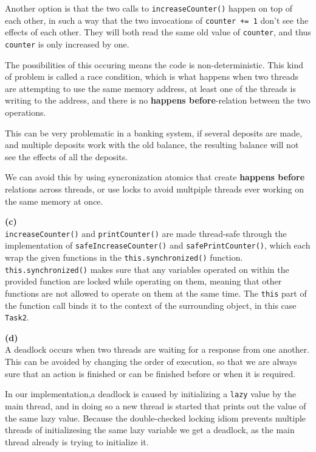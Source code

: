 \documentclass[12pt]{article}
\newcommand{\subtask}[1]{\hspace*{-1cm}\textbf{(#1)}\\[-5mm]}
\begin{document}
Another option is that the two calls to \verb|increaseCounter()| happen on top of each other,
in such a way that the two invocations of \verb|counter += 1| don't see the effects of each other.
They will both read the same old value of \verb|counter|, and thus \verb|counter| is only increased by one.

The possibilities of this occuring means the code is non-deterministic.
This kind of problem is called a race condition, which is what happens when
two threads are attempting to use the same memory address,
at least one of the threads is writing to the address,
and there is no \textbf{happens before}-relation between the two operations.

This can be very problematic in a banking system, if several deposits are made,
and multiple deposits work with the old balance, the resulting balance will not
see the effects of all the deposits.

We can avoid this by using syncronization atomics that create \textbf{happens before}
relations across threads, or use locks to avoid multpiple threads ever working on the same memory at once.

\subtask{c}
\verb|increaseCounter()| and \verb|printCounter()| are made thread-safe through the implementation of \verb|safeIncreaseCounter()| and \verb|safePrintCounter()|, which each wrap the given functions in the \verb|this.synchronized()| function. \verb|this.synchronized()| makes sure that any variables operated on within the provided function are locked while operating on them, meaning that other functions are not allowed to operate on them at the same time. The \verb|this| part of the function call binds it to the context of the surrounding object, in this case \verb|Task2|.

\subtask{d}
A deadlock occurs when two threads are waiting for a response from one another.
This can be avoided by changing the order of execution, so that we are always sure that an action is finished or can be finished before or when it is required.

In our implementation,a deadlock is caused by initializing a \verb|lazy| value by the main thread, and in doing so a new thread is started that prints out the value of the same lazy value. Because the double-checked locking idiom prevents multiple threads of initializesing the same lazy variable we get a deadlock, as the main thread already is trying to initialize it.
\end{document}
